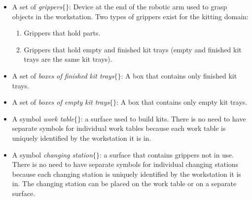 \begin{itemize}
\item A set of {\textit{grippers}}$\lbrace${}$\rbrace$: Device at the end of the robotic arm used to grasp objects in the workstation. Two types of grippers exist for the kitting domain:
    \begin{enumerate}
    \item Grippers that hold parts.
    \item Grippers that hold empty and finished kit trays (empty and finished kit trays are the same kit trays).
    \end{enumerate}

\item A set of {\textit{boxes of finished kit trays}}$\lbrace${}$\rbrace$: A box that contains only finished kit trays.

\item A set of {\textit{boxes of empty kit trays}}$\lbrace${}$\rbrace$: A box that contains only empty kit trays.

\item A symbol {\textit{work table}}$\lbrace$\wtable$\rbrace$: a surface used to build kits. There is no need to have separate symbols for individual work tables because each work table is uniquely identified by the workstation it is in.

\item A symbol {\textit{changing station}}$\lbrace$\chstation$\rbrace$: a surface that contains grippers not in use. There is no need to have separate symbols for individual changing stations because each changing station is uniquely identified by the workstation it is in. The changing station can be placed on the work table or on a separate surface.
\end{itemize} 